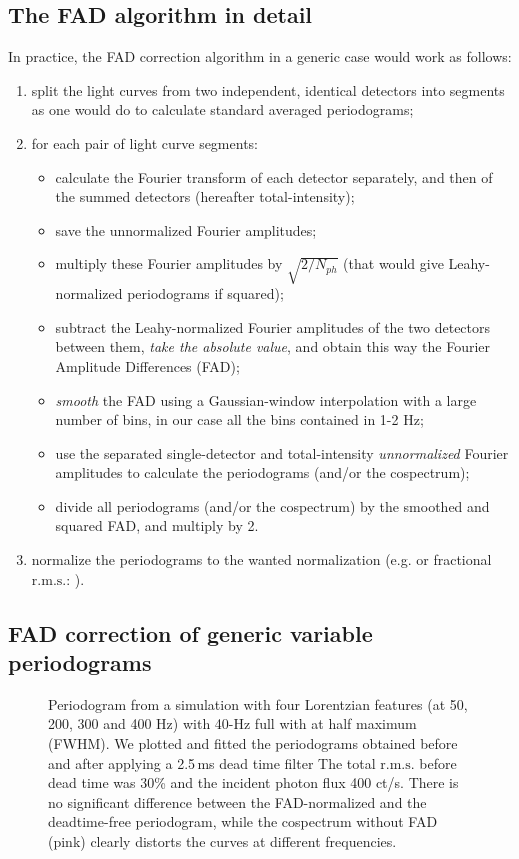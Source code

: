 \documentclass[twocolumn]{aastex61}
\newcommand{\rms}{\ensuremath{\mathrm{r.m.s.}}\xspace}
\begin{document}
\subsection{The FAD algorithm in detail} \label{sec:fad}
In practice, the FAD correction algorithm in a generic case would work as follows:
\begin{enumerate}
\item split the light curves from two independent, identical detectors into segments as one would do to calculate standard averaged periodograms;
\item for each pair of light curve segments: 
	\begin{itemize}
	\item calculate the Fourier transform of each detector separately, and then of the summed detectors (hereafter total-intensity); 
	\item save the unnormalized Fourier amplitudes;
	\item multiply these Fourier amplitudes by $\sqrt{2/N_{ph}}$ (that would give Leahy-normalized periodograms if squared);
	\item subtract the Leahy-normalized Fourier amplitudes of the two detectors between them, \textit{take the absolute value}, and obtain this way the Fourier Amplitude Differences (FAD);
	\item \textit{smooth} the FAD using a Gaussian-window interpolation with a large number of bins, in our case all the bins contained in 1-2 Hz;
	\item use the separated single-detector and total-intensity \textit{unnormalized} Fourier amplitudes to calculate the periodograms (and/or the cospectrum);
	\item divide all periodograms (and/or the cospectrum) by the smoothed and squared FAD, and multiply by 2.
	\end{itemize}
\item normalize the periodograms to the wanted normalization (e.g. \citealt{Leahy+83} or fractional \rms: \citealt{BelloniHasinger90,Miyamoto+91}).
\end{enumerate}

\subsection{FAD correction of generic variable periodograms} \label{sec:correction}

\begin{figure*}
    \caption{Periodogram from a simulation with four Lorentzian features (at 50, 200, 300 and 400 Hz) with 40-Hz full with at half maximum (FWHM). 
    We plotted and fitted the periodograms obtained before and after applying a 2.5\,ms dead time filter
    The total \rms before dead time was 30\% and the incident photon flux 400 ct/s. 
    There is no significant difference between the FAD-normalized and the deadtime-free periodogram, while the cospectrum without FAD (pink) clearly distorts the curves at different frequencies.
    }
    \label{fig:pds}
\end{figure*}
\end{document}
